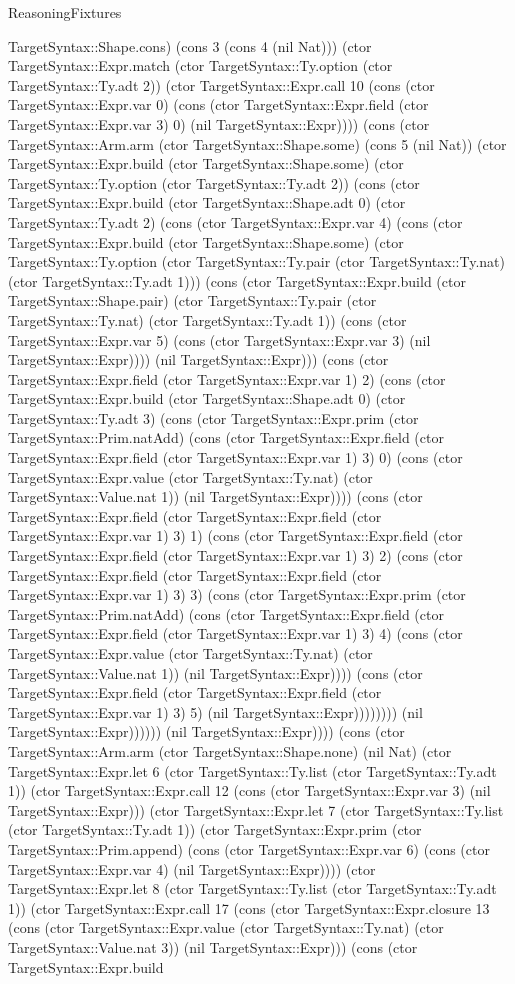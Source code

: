 \begin{lexlean}{ReasoningFixtures}
\begin{semanticmodule}
{TargetSyntax::Shape.cons) (cons 3 (cons 4 (nil Nat))) (ctor TargetSyntax::Expr.match (ctor TargetSyntax::Ty.option (ctor TargetSyntax::Ty.adt 2)) (ctor TargetSyntax::Expr.call 10 (cons (ctor TargetSyntax::Expr.var 0) (cons (ctor TargetSyntax::Expr.field (ctor TargetSyntax::Expr.var 3) 0) (nil TargetSyntax::Expr)))) (cons (ctor TargetSyntax::Arm.arm (ctor TargetSyntax::Shape.some) (cons 5 (nil Nat)) (ctor TargetSyntax::Expr.build (ctor TargetSyntax::Shape.some) (ctor TargetSyntax::Ty.option (ctor TargetSyntax::Ty.adt 2)) (cons (ctor TargetSyntax::Expr.build (ctor TargetSyntax::Shape.adt 0) (ctor TargetSyntax::Ty.adt 2) (cons (ctor TargetSyntax::Expr.var 4) (cons (ctor TargetSyntax::Expr.build (ctor TargetSyntax::Shape.some) (ctor TargetSyntax::Ty.option (ctor TargetSyntax::Ty.pair (ctor TargetSyntax::Ty.nat) (ctor TargetSyntax::Ty.adt 1))) (cons (ctor TargetSyntax::Expr.build (ctor TargetSyntax::Shape.pair) (ctor TargetSyntax::Ty.pair (ctor TargetSyntax::Ty.nat) (ctor TargetSyntax::Ty.adt 1)) (cons (ctor TargetSyntax::Expr.var 5) (cons (ctor TargetSyntax::Expr.var 3) (nil TargetSyntax::Expr)))) (nil TargetSyntax::Expr))) (cons (ctor TargetSyntax::Expr.field (ctor TargetSyntax::Expr.var 1) 2) (cons (ctor TargetSyntax::Expr.build (ctor TargetSyntax::Shape.adt 0) (ctor TargetSyntax::Ty.adt 3) (cons (ctor TargetSyntax::Expr.prim (ctor TargetSyntax::Prim.natAdd) (cons (ctor TargetSyntax::Expr.field (ctor TargetSyntax::Expr.field (ctor TargetSyntax::Expr.var 1) 3) 0) (cons (ctor TargetSyntax::Expr.value (ctor TargetSyntax::Ty.nat) (ctor TargetSyntax::Value.nat 1)) (nil TargetSyntax::Expr)))) (cons (ctor TargetSyntax::Expr.field (ctor TargetSyntax::Expr.field (ctor TargetSyntax::Expr.var 1) 3) 1) (cons (ctor TargetSyntax::Expr.field (ctor TargetSyntax::Expr.field (ctor TargetSyntax::Expr.var 1) 3) 2) (cons (ctor TargetSyntax::Expr.field (ctor TargetSyntax::Expr.field (ctor TargetSyntax::Expr.var 1) 3) 3) (cons (ctor TargetSyntax::Expr.prim (ctor TargetSyntax::Prim.natAdd) (cons (ctor TargetSyntax::Expr.field (ctor TargetSyntax::Expr.field (ctor TargetSyntax::Expr.var 1) 3) 4) (cons (ctor TargetSyntax::Expr.value (ctor TargetSyntax::Ty.nat) (ctor TargetSyntax::Value.nat 1)) (nil TargetSyntax::Expr)))) (cons (ctor TargetSyntax::Expr.field (ctor TargetSyntax::Expr.field (ctor TargetSyntax::Expr.var 1) 3) 5) (nil TargetSyntax::Expr)))))))) (nil TargetSyntax::Expr)))))) (nil TargetSyntax::Expr)))) (cons (ctor TargetSyntax::Arm.arm (ctor TargetSyntax::Shape.none) (nil Nat) (ctor TargetSyntax::Expr.let 6 (ctor TargetSyntax::Ty.list (ctor TargetSyntax::Ty.adt 1)) (ctor TargetSyntax::Expr.call 12 (cons (ctor TargetSyntax::Expr.var 3) (nil TargetSyntax::Expr))) (ctor TargetSyntax::Expr.let 7 (ctor TargetSyntax::Ty.list (ctor TargetSyntax::Ty.adt 1)) (ctor TargetSyntax::Expr.prim (ctor TargetSyntax::Prim.append) (cons (ctor TargetSyntax::Expr.var 6) (cons (ctor TargetSyntax::Expr.var 4) (nil TargetSyntax::Expr)))) (ctor TargetSyntax::Expr.let 8 (ctor TargetSyntax::Ty.list (ctor TargetSyntax::Ty.adt 1)) (ctor TargetSyntax::Expr.call 17 (cons (ctor TargetSyntax::Expr.closure 13 (cons (ctor TargetSyntax::Expr.value (ctor TargetSyntax::Ty.nat) (ctor TargetSyntax::Value.nat 3)) (nil TargetSyntax::Expr))) (cons (ctor TargetSyntax::Expr.build }
\end{semanticmodule}
\end{lexlean}
